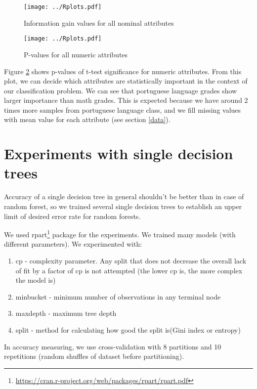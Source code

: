 \documentclass[a4paper]{article}
\begin{document}
% 

\begin{figure}[!hbt]
    \centering
    \texttt{[image: ../Rplots.pdf]}
    \caption[]{Information gain values for all nominal attributes
    \label{fig:nominalIG}
    }
\end{figure}

\begin{figure}[!hbt]
    \centering
    \texttt{[image: ../Rplots.pdf]}
    \caption[]{P-values for all numeric attributes
    \label{fig:pval}
    }
\end{figure}


Figure \ref{fig:pval} shows p-values of t-test significance for numeric attributes.
From this plot, we can decide which attributes are statistically important
in the context of our classification problem.
We can see that portuguese language grades show larger importance than math grades.
This is expected because we have around 2 times more samples from portuguese language
class, and we fill missing values with mean value for each attribute (see section \ref{data}).



\section{Experiments with single decision trees}
\label{expSingle}

Accuracy of a single decision tree in general shouldn't be better than in case of random forest,
so we trained several single decision trees to establish
an upper limit of desired error rate for random forests.

We used rpart\footnote{\url{https://cran.r-project.org/web/packages/rpart/rpart.pdf}} package for the experiments.
We trained many models (with different parameters).
We experimented with:
\begin{enumerate}
    \item cp - complexity parameter.
        Any split that does not decrease the overall lack of fit by a factor of cp is not attempted
        (the lower cp is, the more complex the model is)
    \item minbucket - minimum number of observations in any terminal node
    \item maxdepth - maximum tree depth
    \item split - method for calculating how good the split is(Gini index or entropy)
\end{enumerate}
In accuracy measuring, we use cross-validation with 8 partitions
and 10 repetitions (random shuffles of dataset before partitioning).
% 
\end{document}
